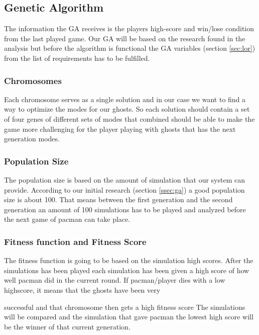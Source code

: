 \subsection{Genetic Algorithm}

The information the GA receives is the players high-score and win/lose condition from the last played game. Our GA will be based on the research found in the analysis but before the algorithm is functional the GA variables (section \ref{sec:lor}) from the list of requirements has to be fulfilled.


\subsubsection{Chromosomes}

Each chromosome serves as a single solution and in our case we want to find a way to optimize the modes for our ghosts. So each solution should contain a set of four genes of different sets of modes that combined should be able to make the game more challenging for the player playing with ghosts that has the next generation modes.

\subsubsection{Population Size}

The population size is based on the amount of simulation that our system can provide. According to our initial research (section \ref{ssec:ga}) a good population size is about 100. That means between the first generation and the second generation an amount of 100 simulations has to be played and analyzed before the next game of pacman can take place.


\subsubsection{Fitness function and Fitness Score}

The fitness function is going to be based on the simulation high scores. After the simulations has been played each simulation has been given a high score of how well pacman did in the current round. If pacman/player dies with a low highscore, it means that the ghosts have been very

successful and that chromosome then gets a high fitness score The simulations will be compared and the simulation that gave pacman the lowest high score will be the winner of that current generation.


